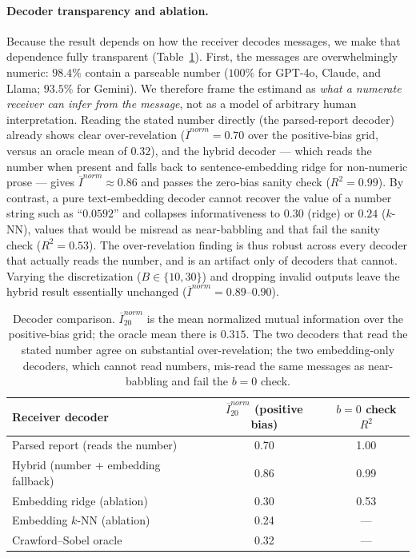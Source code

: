 \documentclass[11pt]{article}
\begin{document}
\paragraph{Decoder transparency and ablation.}
Because the result depends on how the receiver decodes messages, we make that dependence fully transparent (Table~\ref{tab:decoders}).  First, the messages are overwhelmingly numeric: $98.4\%$ contain a parseable number ($100\%$ for GPT-4o, Claude, and Llama; $93.5\%$ for Gemini).  We therefore frame the estimand as \emph{what a numerate receiver can infer from the message}, not as a model of arbitrary human interpretation.  Reading the stated number directly (the parsed-report decoder) already shows clear over-revelation ($\overline I^{norm}=0.70$ over the positive-bias grid, versus an oracle mean of $0.32$), and the hybrid decoder --- which reads the number when present and falls back to sentence-embedding ridge for non-numeric prose --- gives $\overline I^{norm}\approx 0.86$ and passes the zero-bias sanity check ($R^2=0.99$).  By contrast, a pure text-embedding decoder cannot recover the value of a number string such as ``$0.0592$'' and collapses informativeness to $0.30$ (ridge) or $0.24$ ($k$-NN), values that would be misread as near-babbling and that fail the sanity check ($R^2=0.53$).  The over-revelation finding is thus robust across every decoder that actually reads the number, and is an artifact only of decoders that cannot.  Varying the discretization ($B\in\{10,30\}$) and dropping invalid outputs leave the hybrid result essentially unchanged ($\overline I^{norm}=0.89$--$0.90$).

\begin{table}[H]
\centering\small
\caption{Decoder comparison.  $\overline I^{norm}_{20}$ is the mean normalized mutual information over the positive-bias grid; the oracle mean there is $0.315$.  The two decoders that read the stated number agree on substantial over-revelation; the two embedding-only decoders, which cannot read numbers, mis-read the same messages as near-babbling and fail the $b=0$ check.}
\label{tab:decoders}
\begin{tabular}{lcc}
\toprule
Receiver decoder & $\overline I^{norm}_{20}$ (positive bias) & $b=0$ check $R^2$ \\
\midrule
Parsed report (reads the number)        & 0.70 & 1.00 \\
Hybrid (number + embedding fallback)     & 0.86 & 0.99 \\
Embedding ridge (ablation)               & 0.30 & 0.53 \\
Embedding $k$-NN (ablation)              & 0.24 & --- \\
\midrule
Crawford--Sobel oracle                   & 0.32 & --- \\
\bottomrule
\end{tabular}
\end{table}
\end{document}
